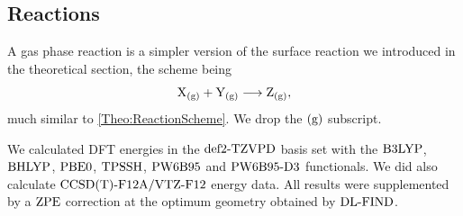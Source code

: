 \documentclass[8.5pt,twoside,twocolumn]{article}
\newcommand\zpe{\enmat{\te{ZPE}}}
\newcommand\gas{\enmat{_\te{(g)}}}
\newcommand\dlfind{\enmat{\te{DL-FIND}}}
\theoremstyle{standard}
\begin{document}
\subsection{Reactions}
\label{Sec:Gas:Reaction}
A gas phase reaction is a simpler version of the surface reaction
we introduced in the theoretical section, the scheme being
\begin{equation}
\X\gas + \Y\gas \chemar \te Z\gas,
\label{Gas:Scheme}
\end{equation}
much similar to \eqref{Theo:ReactionScheme}. We drop the
$(\text g)$ subscript.

We calculated DFT energies in the $\text{def2-TZVPD}$ basis set with
the $\text{B3LYP}$, $\text{BHLYP}$, $\text{PBE0}$, $\text{TPSSH}$, $\text{PW6B95}$ and $\text{PW6B95}\text{-D3}$
functionals. We did also calculate $\text{CCSD(T)-F12A}/\text{VTZ-F}12$ energy data.
All results were supplemented by a $\zpe$ correction at the
optimum geometry obtained by $\dlfind$. 
\end{document}
